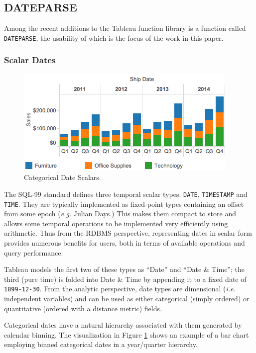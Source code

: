 \subsection{DATEPARSE}
Among the recent additions to the Tableau function library is a function called \texttt{DATEPARSE}, the usability of which is the focus of the work in this paper.

\subsubsection{	Scalar Dates}


\begin{figure}[ht]
\centering
\includegraphics[width=\columnwidth]{figures/FigureI1}
\caption{Categorical Date Scalars.}
\label{fig:I1}
\end{figure}


The SQL-99 standard defines three temporal scalar types: \texttt{DATE}, \texttt{TIMESTAMP} and \texttt{TIME}. They are typically implemented as fixed-point types containing an offset from some epoch (\textit{e.g.} Julian Days.) This makes them compact to store and allows some temporal operations to be implemented very efficiently using arithmetic. Thus from the RDBMS perspective, representing dates in scalar form provides numerous benefits for users, both in terms of available operations and query performance.

Tableau models the first two of these types as ``Date'' and ``Date \& Time''; the third (pure time) is folded into Date \& Time by appending it to a fixed date of \texttt{1899-12-30}. From the analytic perspective, date types are dimensional (\textit{i.e.} independent variables) and can be used as either categorical (simply ordered) or quantitative (ordered with a distance metric) fields.

Categorical dates have a natural hierarchy associated with them generated by calendar binning. The visualization in Figure \ref{fig:I1} shows an example of a bar chart employing binned categorical dates in a year/quarter hierarchy.


